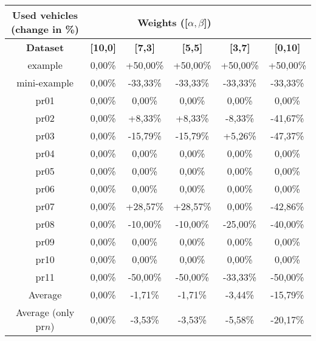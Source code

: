 {
\renewcommand{\arraystretch}{2}
\begin{longtable}[h]{| c | c | c | c | c | c |}
    \hline
    \textbf{Used vehicles (change in \%)} & \multicolumn{4}{c}{\textbf{Weights ([$\alpha,\beta$])}} & \\
    \hline
    \textbf{Dataset} & \textbf{[10,0]} & \textbf{[7,3]} & \textbf{[5,5]} & \textbf{[3,7]} & \textbf{[0,10]} \\
    \hline
    \endhead
    example              & 0,00\% & +50,00\% & +50,00\% & +50,00\% &  +50,00\% \\
    \hline
    mini-example         & 0,00\% & -33,33\% & -33,33\% & -33,33\% &  -33,33\% \\
    \hline
    pr01                 & 0,00\% &   0,00\% &   0,00\% &   0,00\% &    0,00\% \\
    \hline
    pr02                 & 0,00\% &  +8,33\% &  +8,33\% &  -8,33\% &  -41,67\% \\
    \hline
    pr03                 & 0,00\% & -15,79\% & -15,79\% &  +5,26\% &  -47,37\% \\
    \hline
    pr04                 & 0,00\% &   0,00\% &   0,00\% &   0,00\% &    0,00\% \\
    \hline
    pr05                 & 0,00\% &   0,00\% &   0,00\% &   0,00\% &    0,00\% \\
    \hline
    pr06                 & 0,00\% &   0,00\% &   0,00\% &   0,00\% &    0,00\% \\
    \hline
    pr07                 & 0,00\% & +28,57\% & +28,57\% &   0,00\% &  -42,86\% \\
    \hline
    pr08                 & 0,00\% & -10,00\% & -10,00\% & -25,00\% &  -40,00\% \\
    \hline
    pr09                 & 0,00\% &   0,00\% &   0,00\% &   0,00\% &    0,00\% \\
    \hline
    pr10                 & 0,00\% &   0,00\% &   0,00\% &   0,00\% &    0,00\% \\
    \hline
    pr11                 & 0,00\% & -50,00\% & -50,00\% & -33,33\% &  -50,00\% \\
    \hline
    Average              & 0,00\% &  -1,71\% &  -1,71\% &  -3,44\% &  -15,79\% \\
    \hline
    Average (only pr$n$) & 0,00\% &  -3,53\% &  -3,53\% &  -5,58\% &  -20,17\% \\
    \hline
\end{longtable}
}

